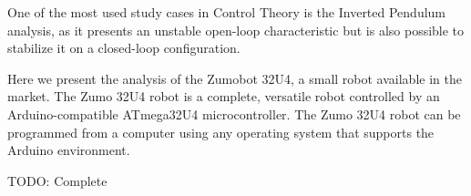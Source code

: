 One of the most used study cases in Control Theory is the Inverted Pendulum analysis, as it presents an unstable open-loop characteristic but is also possible to stabilize it on a closed-loop configuration.

Here we present the analysis of the Zumobot 32U4, a small robot available in the market. The Zumo 32U4 robot is a complete, versatile robot controlled by an Arduino-compatible ATmega32U4 microcontroller. The Zumo 32U4 robot can be programmed from a computer using any operating system that supports the Arduino environment.

TODO: Complete
